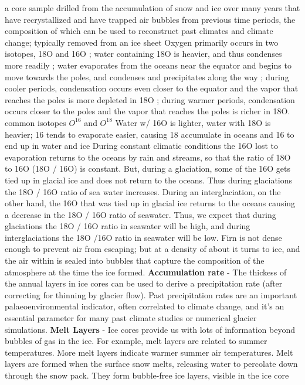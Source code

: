  a core sample drilled from the accumulation of snow and ice over many years that have recrystallized and have trapped air bubbles from previous time periods, the composition of which can be used to reconstruct past climates and climate change; typically removed from an ice sheet
        	Oxygen primarily occurs in two isotopes, 18O and 16O ; water containing 18O is heavier, and thus condenses more readily ; water evaporates from the oceans near the equator and begins to move towards the poles, and condenses and precipitates along the way ; during cooler periods, condensation occurs even closer to the equator  and the vapor that reaches the poles is more depleted in 18O ; during warmer periods, condensation occurs closer to the poles  and the vapor that reaches the poles is richer in 18O.
             common isotopes $O^16$ and $O^18$
            \ddd Water w/ 16O is lighter, water with 18O is heavier; 16 tends to evaporate easier, causing 18 accumulate in oceans and 16 to end up in water and ice
            \ddd During constant climatic conditions the 16O lost to evaporation returns to the oceans by rain and streams, so that the ratio of 18O to 16O (18O / 16O) is constant.
            \ddd But, during a glaciation, some of the 16O gets tied up in glacial ice and does not return to the oceans. Thus during glaciations the 18O / 16O ratio of sea water increases.
            \ddd During an interglaciation, on the other hand, the 16O that was tied up in glacial ice returns to the oceans causing a decrease in the 18O / 16O ratio of seawater.
            \ddd Thus, we expect that during glaciations the 18O / 16O ratio in seawater will be high, and during interglaciations the 18O /16O ratio in seawater will be low.
        	Firn is not dense enough to prevent air from escaping; but at a density of about  it turns to ice, and the air within is sealed into bubbles that capture the composition of the atmosphere at the time the ice formed.
            \ddd \textbf{Accumulation rate} - The thickess of the annual layers in ice cores can be used to derive a precipitation rate (after correcting for thinning by glacier flow). Past precipitation rates are an important palaeoenvironmental indicator, often correlated to climate change, and it’s an essential parameter for many past climate studies or numerical glacier simulations.
            \ddd \textbf{Melt Layers} - Ice cores provide us with lots of information beyond bubbles of gas in the ice. For example, melt layers are related to summer temperatures. More melt layers indicate warmer summer air temperatures. Melt layers are formed when the surface snow melts, releasing water to percolate down through the snow pack. They form bubble-free ice layers, visible in the ice core
